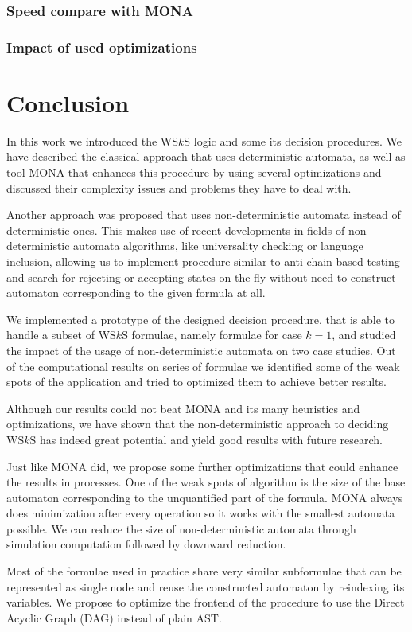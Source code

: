 \subsection{Speed compare with \textsc{MONA}}

\subsection{Impact of used optimizations}

\chapter{Conclusion}\label{summary}

In this work we introduced the WS$k$S logic and some its decision procedures. We
have described the classical approach that uses deterministic automata, as well
as tool \textsc{MONA} that enhances this procedure by using several optimizations and
discussed their complexity issues and problems they have to deal with.

Another approach was proposed that uses non-deterministic automata instead of
deterministic ones. This makes use of recent developments in fields of
non-deterministic automata algorithms, like universality checking or language
inclusion, allowing us to implement procedure similar to anti-chain based
testing \cite{tacas} and search for rejecting or accepting states on-the-fly
without need to construct automaton corresponding to the given formula at all.

We implemented a prototype of the designed decision procedure, that is able to
handle a subset of WS$k$S formulae, namely formulae for case $k = 1$, and
studied the impact of the usage of non-deterministic automata on two case
studies. Out of the computational results on series of formulae we identified
some of the weak spots of the application and tried to optimized them to achieve
better results.

Although our results could not beat \textsc{MONA} and its many heuristics and
optimizations, we have shown that the non-deterministic approach to deciding
WS$k$S has indeed great potential and yield good results with future research.

Just like \textsc{MONA} did, we propose some further optimizations that could
enhance the results in processes. One of the weak spots of algorithm is the size
of the base automaton corresponding to the unquantified part of the formula.
\textsc{MONA} always does minimization after every operation so it works with
the smallest automata possible. We can reduce the size of non-deterministic
automata through simulation computation followed by downward reduction. 

Most of the formulae used in practice share very similar subformulae that can be
represented as single node and reuse the constructed automaton by reindexing its
variables. We propose to optimize the frontend of the procedure to use the
Direct Acyclic Graph (DAG) instead of plain AST. 

